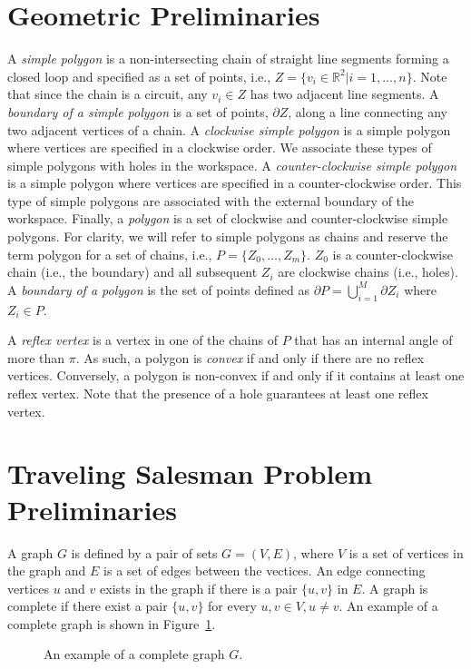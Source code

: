 \documentclass[../main.tex]{subfiles}
\begin{document}
\section{Geometric Preliminaries}
\label{section:background_geometry}

A \emph{simple polygon} is a non-intersecting chain of straight line segments forming a closed loop and specified as a set of points, i.e., $Z=\{v_i\in\mathbb{R}^2|i=1,\ldots,n\}$. Note that since the chain is a circuit, any $v_i\in Z$ has two adjacent line segments. A \emph{boundary of a simple polygon} is a set of points, $\partial Z$, along a line connecting any two adjacent vertices of a chain. A \emph{clockwise simple polygon} is a simple polygon where vertices are specified in a clockwise order. We associate these types of simple polygons with holes in the workspace. A \emph{counter-clockwise simple polygon} is a simple polygon where vertices are specified in a counter-clockwise order. This type of simple polygons are associated with the external boundary of the workspace. Finally, a \emph{polygon} is a set of clockwise and counter-clockwise simple polygons. For clarity, we will refer to simple polygons as chains and reserve the term polygon for a set of chains, i.e., $P=\{Z_0,\ldots,Z_m\}$. $Z_0$ is a counter-clockwise chain (i.e., the boundary) and all subsequent $Z_i$ are clockwise chains (i.e., holes). A \emph{boundary of a polygon} is the set of points defined as $\partial P=\bigcup^M_{i=1}\partial Z_i$ where $Z_i\in P$.

A \emph{reflex vertex} is a vertex in one of the chains of $P$ that has an internal angle of more than $\pi$. As such, a polygon is \emph{convex} if and only if there are no reflex vertices. Conversely, a polygon is non-convex if and only if it contains at least one reflex vertex. Note that the presence of a hole guarantees at least one reflex vertex.

\section{Traveling Salesman Problem Preliminaries}
\label{section:GTSP}

A graph $G$ is defined by a pair of sets $G=(V,E)$, where $V$ is a set of vertices in the graph and $E$ is a set of edges between the vectices. An edge connecting vertices $u$ and $v$ exists in the graph if there is a pair $\{u,v\}$ in $E$. A graph is complete if there exist a pair $\{u,v\}$ for every $u,v\in V, u\neq v$. An example of a complete graph is shown in Figure~\ref{fig:complete_graph}.
\begin{figure}
	\centering
	
	\caption{An example of a complete graph $G$.}
	\label{fig:complete_graph}
\end{figure}
\end{document}
